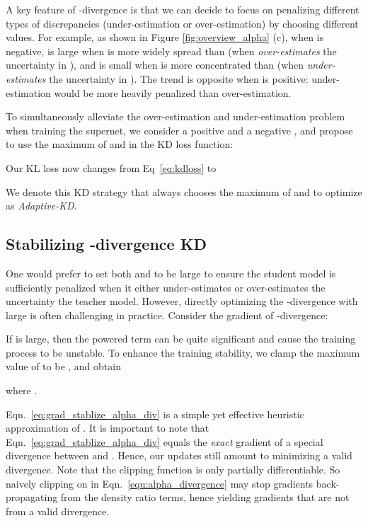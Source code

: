 \documentclass{article}
\begin{document}
A key feature of -divergence is that we can decide to focus on penalizing different types of discrepancies (under-estimation or over-estimation) by choosing different  values. 
For example, 
as shown in Figure \ref{fig:overview_alpha} (c), 
when  is negative, 
 is large when  is more widely spread than 
(when  \emph{over-estimates} the uncertainty in ), 
and is small when  is more concentrated than  
(when  \emph{under-estimates} the uncertainty in ). 
The trend is opposite when  is positive: 
under-estimation would be more heavily penalized than over-estimation. 



To simultaneously alleviate the over-estimation and under-estimation problem when training the supernet, we consider a positive  and a negative , and propose to
use the maximum of 
and  in the KD loss function: 


Our KL loss now changes from  Eq~\eqref{eq:kdloss} to 

We denote this KD strategy that always chooses the maximum of  and  to optimize as \emph{Adaptive-KD}. 



\subsection{Stabilizing -divergence KD}
\label{sec:stablize}


One would prefer to set both  and  to be large to ensure the student model is sufficiently penalized when it either under-estimates or over-estimates the uncertainty the teacher model.
However, 
directly optimizing the -divergence with large  is often challenging in practice. 
Consider the gradient of -divergence:

If  is large, then the powered term  can be quite significant and cause the training process to be unstable.
To enhance the training stability, we clamp the maximum value of  to be , and obtain 

where
 . 


Eqn.~\eqref{eq:grad_stablize_alpha_div} is a simple yet effective heuristic approximation of . It is important to note that Eqn.~\eqref{eq:grad_stablize_alpha_div} equals the \emph{exact} gradient of a special  divergence between  and . Hence, our updates still amount to minimizing a valid divergence. 
Note that the clipping function  is only partially differentiable. 
So naively clipping on  in Eqn.~\eqref{equ:alpha_divergence} may stop gradients back-propagating from the density ratio terms, 
hence yielding gradients that are not from a valid divergence. 
\end{document}
